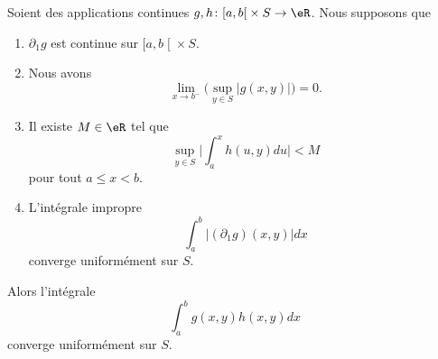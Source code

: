 \begin{theorem}	\label{THOooTLUZooGeOvke}
	Soient des applications continues \(g,h \colon \mathopen[ a,b\mathclose[\times S\to \eR  \). Nous supposons que
	\begin{enumerate}
		\item
		      \( \partial_1g\) est continue sur \(\mathopen[ a,b\mathclose[\times S \).
		\item		\label{ITEMooZKXTooVocyVc}
		      Nous avons
		      \begin{equation}
			      \lim_{x\to b^-}\Big( \sup_{y\in S}| g(x,y) | \Big)=0.
		      \end{equation}
		\item		\label{ITEMooEPPPooPrbHYe}
		      Il existe \( M\in \eR\) tel que
		      \begin{equation}
			      \sup_{y\in S}\big| \int_a^xh(u,y)du \big|<M
		      \end{equation}
		      pour tout \( a\leq x<b\).
		\item		\label{ITEMooOQNNooPDdEQi}
		      L'intégrale impropre
		      \begin{equation}
			      \int_a^b|(\partial_1g)(x,y)|dx
		      \end{equation}
		      converge uniformément sur \( S\).
	\end{enumerate}
	Alors l'intégrale
	\begin{equation}
		\int_a^bg(x,y)h(x,y)dx
	\end{equation}
	converge uniformément sur \( S\).
\end{theorem}

